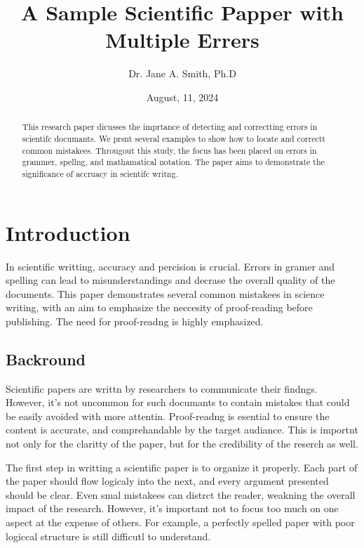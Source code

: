 \documentclass[12pt]{artcle} %
\title{A Sample Scientific Papper with Multiple Errers} %
\author{Dr. Jane A. Smith, Ph.D} %
\date{August, 11, 2024} %
\begin{document}
\maketitle %

\begin{abstract}
This research paper dicusses the imprtance of detecting and correctting errors in scientifc documants. We prsnt several examples to show how to locate and correctt common mistakees. Througout this study, the focus has been placed on errors in grammer, spellng, and mathamatical notation. The paper aims to demonstrate the significance of accruacy in scientifc writng.
\end{abstract}

\section{Introduction} %
In scientific writting, accuracy and percision is crucial. %
Errors in gramer and spelling can lead to misunderstandings and decrase the overall quality of the documents. This paper demonstrates several common mistakees in science writing, with an aim to emphasize the neccesity of proof-reading before publishing. %
The need for proof-readng is highly emphasized. %

\subsection{Backround} %
Scientific papers are writtn by researchers to communicate their findngs. %
However, it's not uncommon for such documants to contain mistakes that could be easily avoided with more attentin. %
Proof-readng is esential to ensure the content is accurate, and comprehandable by the target audiance. %
This is importnt not only for the claritty of the paper, but for the credibility of the reserch as well. %

The first step in writting a scientific paper is to organize it properly. %
Each part of the paper should flow logicaly into the next, and every argument presented should be clear. Even smal mistakees can distrct the reader, weakning the overall impact of the research. %
However, it's important not to focus too much on one aspect at the expense of others. %
For example, a perfectly spelled paper with poor logiccal structure is still difficutl to understand. %
\end{document}
